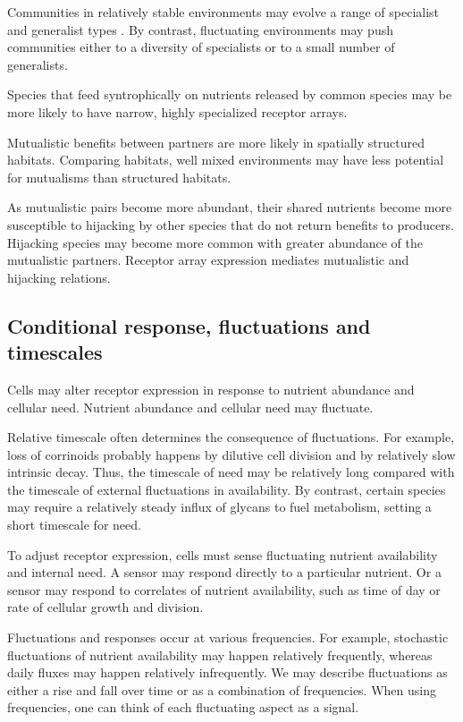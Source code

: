 \documentclass[\mydocfontsize]{article}
\begin{document}
\begin{multicols}{2}
Communities in relatively stable environments may evolve a range of specialist and generalist types \autocite{frank93evolution}. By contrast, fluctuating environments may push communities either to a diversity of specialists or to a small number of generalists. 

Species that feed syntrophically on nutrients released by common species may be more likely to have narrow, highly specialized receptor arrays.  

Mutualistic benefits between partners are more likely in spatially structured habitats. Comparing habitats, well mixed environments may have less potential for mutualisms than structured habitats. 

As mutualistic pairs become more abundant, their shared nutrients become more susceptible to hijacking by other species that do not return benefits to producers. Hijacking species may become more common with greater abundance of the mutualistic partners. Receptor array expression mediates mutualistic and hijacking relations.

\subsection{Conditional response, fluctuations and timescales} 

Cells may alter receptor expression in response to nutrient abundance and cellular need. Nutrient abundance and cellular need may fluctuate.

 Relative timescale often determines the consequence of fluctuations. For example, loss of corrinoids probably happens by dilutive cell division and by relatively slow intrinsic decay. Thus, the timescale of need may be relatively long compared with the timescale of external fluctuations in availability. By contrast, certain species may require a relatively steady influx of glycans to fuel metabolism, setting a short timescale for need. 

 To adjust receptor expression, cells must sense fluctuating nutrient availability and internal need. A sensor may respond directly to a particular nutrient. Or a sensor may respond to correlates of nutrient availability, such as time of day or rate of cellular growth and division. 

 Fluctuations and responses occur at various frequencies. For example, stochastic fluctuations of nutrient availability may happen relatively frequently, whereas daily fluxes may happen relatively infrequently. We may describe fluctuations as either a rise and fall over time or as a combination of frequencies. When using frequencies, one can think of each fluctuating aspect as a signal. 


\end{multicols}
\end{document}

